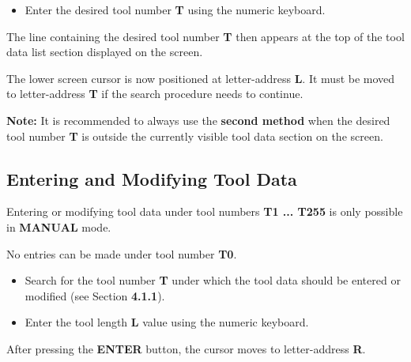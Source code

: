 \begin{itemize}
    \item Enter the desired tool number \textbf{T} using the numeric keyboard.
    \vspace{.6cm}
\end{itemize}

The line containing the desired tool number \textbf{T} then appears at the top of the tool data list section displayed on the screen.

The lower screen cursor is now positioned at letter-address \textbf{L}. It must be moved to letter-address \textbf{T} if the search procedure needs to continue.

\textbf{Note:} It is recommended to always use the \textbf{second method} when the desired tool number \textbf{T} is outside the currently visible tool data section on the screen.

\subsection{Entering and Modifying Tool Data}

Entering or modifying tool data under tool numbers \textbf{T1 ... T255} is only possible in \textbf{MANUAL} mode.

No entries can be made under tool number \textbf{T0}.

\procedure

\begin{itemize}
    \vspace{.6cm}
    \vspace{.5cm}
    \item Search for the tool number \textbf{T} under which the tool data should be entered or modified (see Section \textbf{4.1.1}).
    \item Enter the tool length \textbf{L} value using the numeric keyboard.
\end{itemize}

\vspace{.5cm}

After pressing the \textbf{ENTER} button, the cursor moves to letter-address \textbf{R}.


